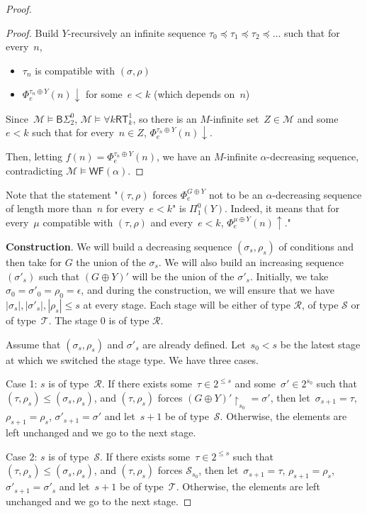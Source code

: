 \documentclass{article}
\numberwithin{theorem}{section}
\newcommand{\BSig}{\mathsf{B}\Sigma^0}
\newcommand{\WF}{\mathsf{WF}}
\newcommand{\RT}{\mathsf{RT}}
\newcommand{\R}{\mathcal{R}}
\renewcommand{\S}{\mathcal{S}}
\newcommand{\T}{\mathcal{T}}
\newcommand{\M}{\mathcal{M}}
\newcommand{\uh}[0]{{\upharpoonright}}
\begin{document}
\begin{proof}
\begin{proof}
Build $Y$-recursively an infinite sequence $\tau_0 \preceq \tau_1 \preceq \tau_2 \preceq \dots$ such that for every~$n$,
\begin{itemize}
    \item $\tau_n$ is compatible with $(\sigma, \rho)$
    \item $\Phi^{\tau_n \oplus Y}_e(n)\downarrow$ for some~$e < k$ (which depends on~$n$)
\end{itemize}
Since~$\M \models \BSig_2$, $\M \models \forall k\RT^1_k$,
so there is an $M$-infinite set~$Z \in \M$ and some~$e < k$ such that for every~$n \in Z$, $\Phi^{\tau_n \oplus Y}_e(n)\downarrow$.

Then, letting $f(n) = \Phi^{\tau_n \oplus Y}_e(n)$, we have an $M$-infinite $\alpha$-decreasing sequence, contradicting $\M \models \WF(\alpha)$.
\end{proof}

Note that the statement "$(\tau, \rho)$ forces $\Phi_e^{G \oplus Y}$ not to be an $\alpha$-decreasing sequence of length more than~$n$ for every~$e < k$"
is $\Pi^0_1(Y)$. Indeed, it means that for every~$\mu$ compatible with $(\tau, \rho)$ and every~$e < k$, $\Phi_e^{\mu \oplus Y}(n)\uparrow$."
\bigskip

\textbf{Construction}.
We will build a decreasing sequence $(\sigma_s, \rho_s)$ of conditions and then take for $G$ the union of the $\sigma_s$. We will also build an increasing sequence $(\sigma'_s)$ such that $(G \oplus Y)'$ will be the union of the $\sigma'_s$. Initially, we take $\sigma_0 = \sigma'_0 = \rho_0 = \epsilon$, and during the construction, we will ensure that we have $|\sigma_s|, |\sigma'_s|, |\rho_s| \leq s$ at every stage. Each stage will be either of type $\R$, of type $\S$ or of type~$\T$. The stage $0$ is of type $\R$.

Assume that $(\sigma_{s}, \rho_{s})$ and $\sigma'_{s}$ are already defined. Let~$s_0 < s$ be the latest stage at which we switched the stage type. We have three cases.

Case 1: $s$ is of type~$\R$. If there exists some~$\tau \in 2^{\leq s}$ and some~$\sigma' \in 2^{s_0}$ such that $(\tau, \rho_s) \leq (\sigma_s, \rho_s)$, and 
$(\tau, \rho_s)$ forces $(G \oplus Y)' \uh_{s_0} = \sigma'$, then let~$\sigma_{s+1} = \tau$, $\rho_{s+1} = \rho_s$, $\sigma'_{s+1} = \sigma'$ and let~$s+1$ be of type~$\S$. Otherwise, the elements are left unchanged and we go to the next stage.

Case 2: $s$ is of type~$\S$. If there exists some~$\tau \in 2^{\leq s}$ such that $(\tau, \rho_s) \leq (\sigma_s, \rho_s)$, and $(\tau, \rho_s)$ forces $\S_{s_0}$, then let~$\sigma_{s+1} = \tau$, $\rho_{s+1} = \rho_s$, $\sigma'_{s+1} = \sigma'_s$ and let~$s+1$ be of type~$\T$. Otherwise, the elements are left unchanged and we go to the next stage.


\end{proof}
\end{document}
